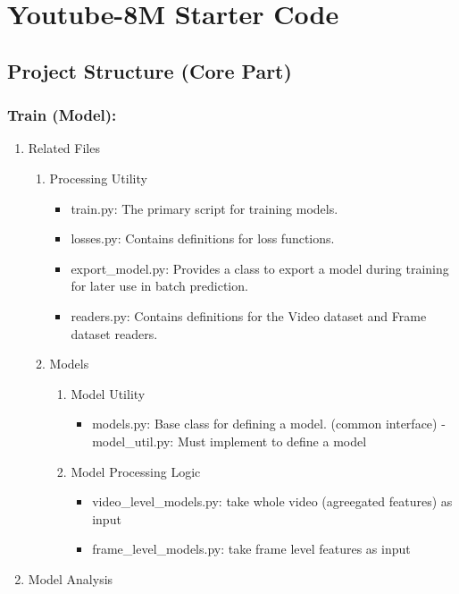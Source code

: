 \documentclass[11pt]{article}
\author{Jing-jiang Li}
\date{\today}
\title{}
\begin{document}
\tableofcontents

\section{Youtube-8M Starter Code}
\label{sec:orgb727322}

\subsection{Project Structure (Core Part)}
\label{sec:org72e023b}

\subsubsection{Train (Model):}
\label{sec:org9d6c1f0}

\begin{enumerate}
\item Related Files
\label{sec:orgf38be2a}

\begin{enumerate}
\item Processing Utility
\label{sec:org40acb0b}
\begin{itemize}
\item train.py: The primary script for training models.
\item losses.py: Contains definitions for loss functions.
\item export\_model.py: Provides a class to export a model during training for later use in batch prediction.
\item readers.py: Contains definitions for the Video dataset and Frame dataset readers.
\end{itemize}
\item Models
\label{sec:orga201e1d}
\begin{enumerate}
\item Model Utility
\label{sec:org0368e2c}
\begin{itemize}
\item models.py: Base class for defining a model. (common interface) - model\_util.py: Must implement to define a model
\end{itemize}
\item Model Processing Logic
\label{sec:orgbf23828}
\begin{itemize}
\item video\_level\_models.py: take whole video (agreegated features) as input
\item frame\_level\_models.py: take frame level features as input
\end{itemize}
\end{enumerate}
\end{enumerate}
\item Model Analysis
\label{sec:orgd28958b}


\end{enumerate}
\end{document}
